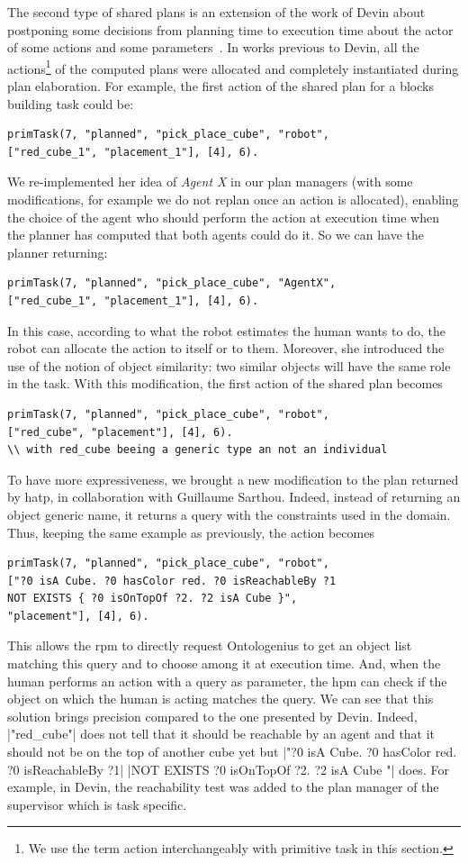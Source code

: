 \documentclass[a4paper,11pt,twoside]{StyleThese}
\begin{document}
The second type of shared plans is an extension of the work of Devin about postponing some decisions from planning time to execution time about the actor of some actions and some parameters~\cite{devin_2017_decisions}. In works previous to Devin, all the actions\footnote{We use the term action interchangeably with primitive task in this section.} of the computed plans were
allocated and completely instantiated during plan elaboration. For example, the first action of the shared plan for a blocks building task could be: 
\begin{lstlisting}[style=inline]
primTask(7, "planned", "pick_place_cube", "robot", 
["red_cube_1", "placement_1"], [4], 6).
\end{lstlisting}
We re-implemented her idea of \emph{Agent X} in our plan managers (with some modifications, for example we do not replan once an action is allocated), enabling the choice of the agent who should perform the action at execution time when the planner has computed that both agents could do it. So we can have the planner returning:
\begin{lstlisting}[style=inline]
primTask(7, "planned", "pick_place_cube", "AgentX", 
["red_cube_1", "placement_1"], [4], 6).
\end{lstlisting} 
In this case, according to what the robot estimates the human wants to do, the robot can allocate the action to itself or to them. Moreover, she introduced the use of the notion of object similarity: two similar objects will have the same role in the task. With this modification, the first action of the shared plan becomes
\begin{lstlisting}[style=inline]
primTask(7, "planned", "pick_place_cube", "robot", 
["red_cube", "placement"], [4], 6).
\\ with red_cube beeing a generic type an not an individual
\end{lstlisting}
To have more expressiveness, we brought a new modification to the plan returned by \acrshort{hatp}, in collaboration with Guillaume Sarthou. Indeed, instead of returning an object generic name, it returns a \sparql{} query with the constraints used in the domain. Thus, keeping the same example as previously, the action becomes
\begin{lstlisting}[style=inline]
primTask(7, "planned", "pick_place_cube", "robot", 
["?0 isA Cube. ?0 hasColor red. ?0 isReachableBy ?1 
NOT EXISTS { ?0 isOnTopOf ?2. ?2 isA Cube }", 
"placement"], [4], 6).
\end{lstlisting}
This allows the \acrshort{rpm} to directly request Ontologenius to get an object list matching this query and to choose among it at execution time. And, when the human performs an action with a \sparql{} query as parameter, the \acrshort{hpm} can check if the object on which the human is acting matches the query. We can see that this solution brings precision compared to the one presented by Devin. Indeed, |"red_cube"| does not tell that it should be reachable by an agent and that it should not be on the top of another cube yet but |"?0 isA Cube. ?0 hasColor red. ?0 isReachableBy ?1| |NOT EXISTS { ?0 isOnTopOf ?2. ?2 isA Cube }"| does. For example, in Devin, the reachability test was added to the plan manager of the supervisor which is task specific. 
\end{document}
